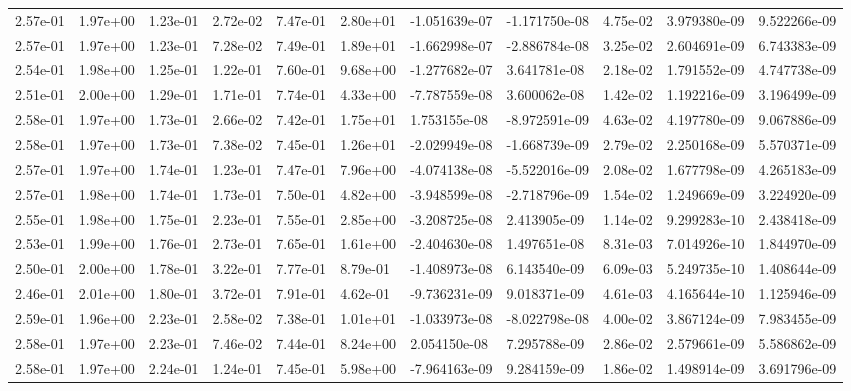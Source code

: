 \begin{longtable}{| p{} | p{} |}
2.57e-01 & 1.97e+00 & 1.23e-01 & 2.72e-02 & 7.47e-01 & 2.80e+01 & -1.051639e-07 & -1.171750e-08 &  4.75e-02 &  3.979380e-09 &  9.522266e-09 \\
2.57e-01 & 1.97e+00 & 1.23e-01 & 7.28e-02 & 7.49e-01 & 1.89e+01 & -1.662998e-07 & -2.886784e-08 &  3.25e-02 &  2.604691e-09 &  6.743383e-09 \\
2.54e-01 & 1.98e+00 & 1.25e-01 & 1.22e-01 & 7.60e-01 & 9.68e+00 & -1.277682e-07 &  3.641781e-08 &  2.18e-02 &  1.791552e-09 &  4.747738e-09 \\
2.51e-01 & 2.00e+00 & 1.29e-01 & 1.71e-01 & 7.74e-01 & 4.33e+00 & -7.787559e-08 &  3.600062e-08 &  1.42e-02 &  1.192216e-09 &  3.196499e-09 \\
2.58e-01 & 1.97e+00 & 1.73e-01 & 2.66e-02 & 7.42e-01 & 1.75e+01 &  1.753155e-08 & -8.972591e-09 &  4.63e-02 &  4.197780e-09 &  9.067886e-09 \\
2.58e-01 & 1.97e+00 & 1.73e-01 & 7.38e-02 & 7.45e-01 & 1.26e+01 & -2.029949e-08 & -1.668739e-09 &  2.79e-02 &  2.250168e-09 &  5.570371e-09 \\
2.57e-01 & 1.97e+00 & 1.74e-01 & 1.23e-01 & 7.47e-01 & 7.96e+00 & -4.074138e-08 & -5.522016e-09 &  2.08e-02 &  1.677798e-09 &  4.265183e-09 \\
2.57e-01 & 1.98e+00 & 1.74e-01 & 1.73e-01 & 7.50e-01 & 4.82e+00 & -3.948599e-08 & -2.718796e-09 &  1.54e-02 &  1.249669e-09 &  3.224920e-09 \\
2.55e-01 & 1.98e+00 & 1.75e-01 & 2.23e-01 & 7.55e-01 & 2.85e+00 & -3.208725e-08 &  2.413905e-09 &  1.14e-02 &  9.299283e-10 &  2.438418e-09 \\
2.53e-01 & 1.99e+00 & 1.76e-01 & 2.73e-01 & 7.65e-01 & 1.61e+00 & -2.404630e-08 &  1.497651e-08 &  8.31e-03 &  7.014926e-10 &  1.844970e-09 \\
2.50e-01 & 2.00e+00 & 1.78e-01 & 3.22e-01 & 7.77e-01 & 8.79e-01 & -1.408973e-08 &  6.143540e-09 &  6.09e-03 &  5.249735e-10 &  1.408644e-09 \\
2.46e-01 & 2.01e+00 & 1.80e-01 & 3.72e-01 & 7.91e-01 & 4.62e-01 & -9.736231e-09 &  9.018371e-09 &  4.61e-03 &  4.165644e-10 &  1.125946e-09 \\
2.59e-01 & 1.96e+00 & 2.23e-01 & 2.58e-02 & 7.38e-01 & 1.01e+01 & -1.033973e-08 & -8.022798e-08 &  4.00e-02 &  3.867124e-09 &  7.983455e-09 \\
2.58e-01 & 1.97e+00 & 2.23e-01 & 7.46e-02 & 7.44e-01 & 8.24e+00 &  2.054150e-08 &  7.295788e-09 &  2.86e-02 &  2.579661e-09 &  5.586862e-09 \\
2.58e-01 & 1.97e+00 & 2.24e-01 & 1.24e-01 & 7.45e-01 & 5.98e+00 & -7.964163e-09 &  9.284159e-09 &  1.86e-02 &  1.498914e-09 &  3.691796e-09 \\

\end{longtable}
